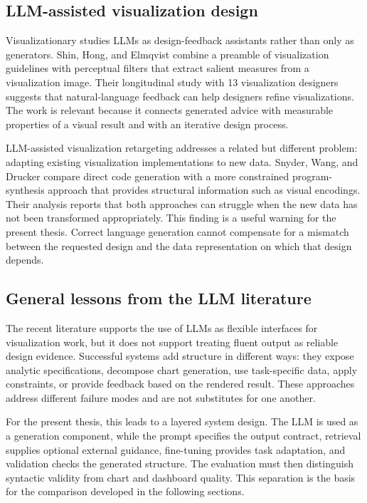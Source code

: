 \subsection{LLM-assisted visualization design}

Visualizationary studies LLMs as design-feedback assistants rather than only as generators. Shin, Hong, and Elmqvist \cite{shin2025visualizationary} combine a preamble of visualization guidelines with perceptual filters that extract salient measures from a visualization image. Their longitudinal study with 13 visualization designers suggests that natural-language feedback can help designers refine visualizations. The work is relevant because it connects generated advice with measurable properties of a visual result and with an iterative design process.

LLM-assisted visualization retargeting addresses a related but different problem: adapting existing visualization implementations to new data. Snyder, Wang, and Drucker \cite{snyder2025retargeting} compare direct code generation with a more constrained program-synthesis approach that provides structural information such as visual encodings. Their analysis reports that both approaches can struggle when the new data has not been transformed appropriately. This finding is a useful warning for the present thesis. Correct language generation cannot compensate for a mismatch between the requested design and the data representation on which that design depends.

\subsection{General lessons from the LLM literature}

The recent literature supports the use of LLMs as flexible interfaces for visualization work, but it does not support treating fluent output as reliable design evidence. Successful systems add structure in different ways: they expose analytic specifications, decompose chart generation, use task-specific data, apply constraints, or provide feedback based on the rendered result. These approaches address different failure modes and are not substitutes for one another.

For the present thesis, this leads to a layered system design. The LLM is used as a generation component, while the prompt specifies the output contract, retrieval supplies optional external guidance, fine-tuning provides task adaptation, and validation checks the generated structure. The evaluation must then distinguish syntactic validity from chart and dashboard quality. This separation is the basis for the comparison developed in the following sections.


